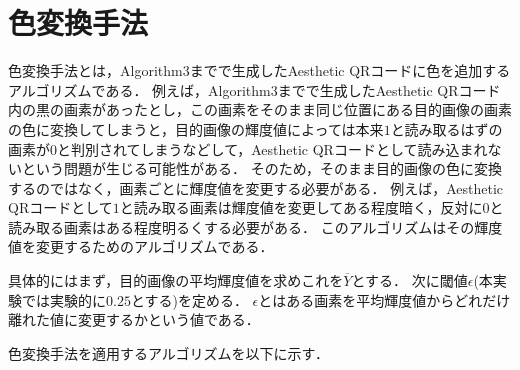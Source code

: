 \documentclass{thesis}
\begin{document}
\newpage
\section{色変換手法}

色変換手法とは，Algorithm$3$までで生成したAesthetic QRコードに色を追加するアルゴリズムである．
例えば，Algorithm$3$までで生成したAesthetic QRコード内の黒の画素があったとし，この画素をそのまま同じ位置にある目的画像の画素の色に変換してしまうと，目的画像の輝度値によっては本来$1$と読み取るはずの画素が$0$と判別されてしまうなどして，Aesthetic QRコードとして読み込まれないという問題が生じる可能性がある．
そのため，そのまま目的画像の色に変換するのではなく，画素ごとに輝度値を変更する必要がある．
例えば，Aesthetic QRコードとして$1$と読み取る画素は輝度値を変更してある程度暗く，反対に$0$と読み取る画素はある程度明るくする必要がある．
このアルゴリズムはその輝度値を変更するためのアルゴリズムである．

具体的にはまず，目的画像の平均輝度値を求めこれを$\overline{Y}$とする．
次に閾値$\epsilon$(本実験では実験的に$0.25$とする)を定める．
$\epsilon$とはある画素を平均輝度値からどれだけ離れた値に変更するかという値である．



色変換手法を適用するアルゴリズムを以下に示す．
\end{document}
